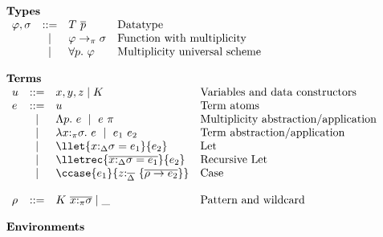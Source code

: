 
\begin{figure}[h]
\begin{framed}
\[
\begin{array}{l}
%
\textbf{Types} \\
\begin{array}{lcll}
    \varphi,\sigma & ::= & T~\overline{p} & \textrm{Datatype} \\
                   & \mid & \varphi \to_\pi \sigma & \textrm{Function with multiplicity}\\
                   & \mid & \forall p.~\varphi & \textrm{Multiplicity universal scheme}\\
\end{array}\\\\
%
\textbf{Terms}\\
\begin{array}{lcll}
    u               & ::=  & x,y,z \mid K                           & \textrm{Variables and data constructors}\\
    e               & ::=  & u                                  & \textrm{Term atoms}\\
                    & \mid & \Lambda p.~e~\mid~e~\pi  & \textrm{Multiplicity abstraction/application}\\
                    & \mid & \lambda x{:}_\pi\sigma.~e~\mid~e_1~e_2 & \textrm{Term abstraction/application}\\
                    & \mid & \llet{x{:}_\Delta\sigma = e_1}{e_2}       & \textrm{Let} \\
                    & \mid & \lletrec{\overline{x{:}_\Delta\sigma = e_1}}{e_2}  & \textrm{Recursive Let} \\
                    & \mid & \ccase{e_1}{z{:}_{\overline{\Delta}}~\{\overline{\rho\to e_2}\}}   & \textrm{Case} \\
                    &      &                                    & \\
    \rho            & ::= & K~\overline{x{:}_\pi\sigma} \mid \_ & \textrm{Pattern and wildcard} \\
\end{array}\\\\
%
\textbf{Environments}\\

\end{array}\]
\end{framed}
\end{figure}
